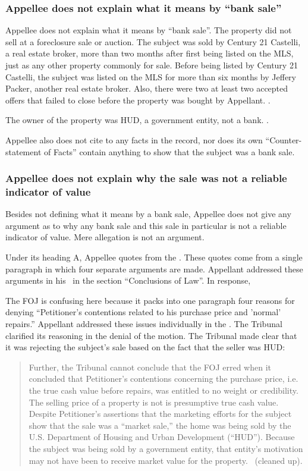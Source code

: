 \documentclass[12pt,\documentclassflag]{michiganCourtOfAppealsBrief}
\begin{document}
\subsubsection{Appellee does not explain what it means by ``bank sale''}
Appellee does not explain what it means by ``bank sale''. The property did not sell at a foreclosure sale or auction. The subject was sold by Century 21 Castelli, a real estate broker, more than two months after first being listed on the MLS, just as any other property commonly for sale. Before being listed by Century 21 Castelli, the subject was listed on the MLS for more than six months by Jeffery Packer, another real estate broker. Also, there were two at least two accepted offers that failed to close before the property was bought by Appellant. \mlsHistory.

The owner of the property was HUD, a government entity, not a bank. \mlsListing.

Appellee also does not cite to any facts in the record, nor does its own ``Counter-statement of Facts'' contain anything to show that the subject was a bank sale. 

\subsubsection{Appellee does not explain why the sale was not a reliable indicator of value}

Besides not defining what it means by a bank sale, Appellee does not give any argument as to why any bank sale and this sale in particular is not a reliable indicator of value. Mere allegation is not an argument. 

Under its heading A, Appellee quotes from the \foj[5]. These quotes come from a single paragraph in which four separate arguments are made. Appellant addressed these arguments in his \motionForReconsideration[4-5]\ in the section ``Conclusions of Law''. In response, 

The FOJ is confusing here because it packs into one paragraph four reasons for denying ``Petitioner's contentions related to his purchase price and 'normal' repairs.'' Appellant addressed these issues individually in the \motionForReconsideration[4-5]. The Tribunal clarified its reasoning in the denial of the motion. The Tribunal made clear that it was rejecting the subject's sale based on the fact that the seller was HUD:

\begin{quote}
Further, the Tribunal cannot conclude that the FOJ erred when it
concluded that Petitioner's contentions concerning the purchase price, i.e. the true cash value before repairs, was entitled to no weight or credibility. The selling price of a property is not is presumptive true cash value. Despite Petitioner's assertions that the marketing efforts for the subject show that the sale was a ``market sale,'' the home was
being sold by the U.S. Department of Housing and Urban Development (``HUD''). Because the subject was being sold by a government entity, that entity's motivation may not have been to receive market value for the property. \reconsiderationDenied[2]\ (cleaned up).
\end{quote}
\end{document}
